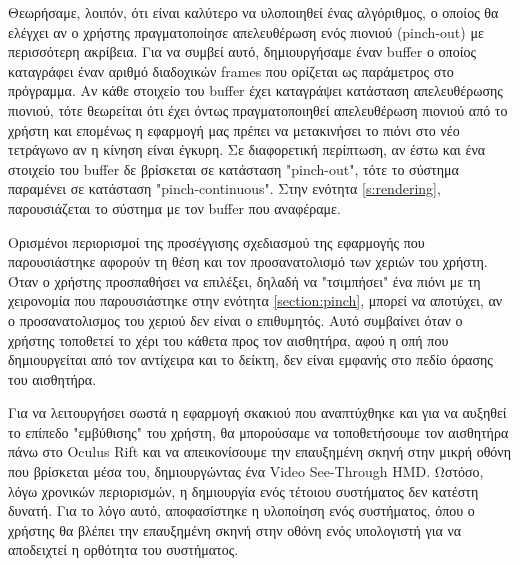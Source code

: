 Θεωρήσαμε, λοιπόν, ότι είναι καλύτερο να υλοποιηθεί ένας αλγόριθμος, ο οποίος θα ελέγχει αν ο χρήστης πραγματοποίησε απελευθέρωση ενός πιονιού (pinch-out) με περισσότερη ακρίβεια. Για να συμβεί αυτό, δημιουργήσαμε έναν buffer ο οποίος καταγράφει έναν αριθμό διαδοχικών frames που ορίζεται ως παράμετρος στο πρόγραμμα. Αν κάθε στοιχείο του buffer έχει καταγράψει κατάσταση απελευθέρωσης πιονιού, τότε θεωρείται ότι έχει όντως πραγματοποιηθεί απελευθέρωση πιονιού από το χρήστη και επομένως η εφαρμογή μας πρέπει να μετακινήσει το πιόνι στο νέο τετράγωνο αν η κίνηση είναι έγκυρη. Σε διαφορετική περίπτωση, αν έστω και ένα στοιχείο του buffer δε βρίσκεται σε κατάσταση "pinch-out", τότε το σύστημα παραμένει σε κατάσταση "pinch-continuous". Στην ενότητα \ref{s:rendering}, παρουσιάζεται το σύστημα με τον buffer που αναφέραμε. 



Ορισμένοι περιορισμοί της προσέγγισης σχεδιασμού της εφαρμογής που παρουσιάστηκε αφορούν τη θέση και τον προσανατολισμό των χεριών του χρήστη. Όταν ο χρήστης προσπαθήσει να επιλέξει, δηλαδή να "τσιμπήσει" ένα πιόνι με τη χειρονομία που παρουσιάστηκε στην ενότητα \ref{section:pinch}, μπορεί να αποτύχει, αν ο προσανατολισμος του χεριού δεν είναι ο επιθυμητός. Αυτό συμβαίνει όταν ο χρήστης τοποθετεί το χέρι του κάθετα προς τον αισθητήρα, αφού η οπή που δημιουργείται από τον αντίχειρα και το δείκτη, δεν είναι εμφανής στο πεδίο όρασης του αισθητήρα.




Για να λειτουργήσει σωστά η εφαρμογή σκακιού που αναπτύχθηκε και για να αυξηθεί το επίπεδο "εμβύθισης" του χρήστη, θα μπορούσαμε να τοποθετήσουμε τον αισθητήρα πάνω στο Oculus Rift και να απεικονίσουμε την επαυξημένη σκηνή στην μικρή οθόνη που βρίσκεται μέσα του, δημιουργώντας ένα Video See-Through HMD. Ωστόσο, λόγω χρονικών περιορισμών, η δημιουργία ενός τέτοιου συστήματος δεν κατέστη δυνατή. Για το λόγο αυτό, αποφασίστηκε η υλοποίηση ενός συστήματος, όπου ο χρήστης θα βλέπει την επαυξημένη σκηνή στην οθόνη ενός υπολογιστή για να αποδειχτεί η ορθότητα του συστήματος. 


